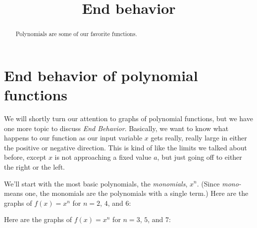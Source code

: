 \documentclass{ximera}
\title[Dig-In:]{End behavior}
\begin{document}
\begin{abstract}
  Polynomials are some of our favorite functions. 
\end{abstract}
\maketitle



\section{End behavior of polynomial functions}
We will shortly turn our attention to graphs of polynomial functions, but we have one more topic to discuss \emph{End Behavior}.
Basically, we want to know what happens to our function as our input variable $x$ gets really, really large in either the positive or negative direction.
This is kind of like the limits we talked about before, except $x$ is not approaching a fixed value $a$, but just going off to either the right or the left.

We'll start with the most basic polynomials, the \emph{monomials}, $x^n$.  (Since \emph{mono-} means one, the monomials are the polynomials with a single term.)
Here are the graphs of $f(x)=x^n$ for $n = 2$, $4$, and $6$:
	\begin{center}
	\end{center}

	
Here are the graphs of $f(x)=x^n$ for $n = 3$, $5$, and $7$:
	\begin{center}
	\end{center}
\end{document}
